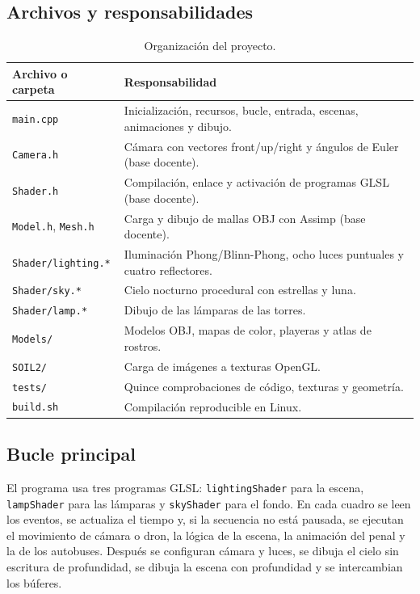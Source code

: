 \documentclass[12pt,letterpaper]{article}
\begin{document}
\subsection{Archivos y responsabilidades}
\begin{table}[H]
\centering
\small
\begin{tabular}{p{}p{}}
\toprule
\textbf{Archivo o carpeta} & \textbf{Responsabilidad}\\
\midrule
\texttt{main.cpp} & Inicialización, recursos, bucle, entrada, escenas, animaciones y dibujo.\\
\texttt{Camera.h} & Cámara con vectores front/up/right y ángulos de Euler (base docente).\\
\texttt{Shader.h} & Compilación, enlace y activación de programas GLSL (base docente).\\
\texttt{Model.h}, \texttt{Mesh.h} & Carga y dibujo de mallas OBJ con Assimp (base docente).\\
\texttt{Shader/lighting.*} & Iluminación Phong/Blinn-Phong, ocho luces puntuales y cuatro reflectores.\\
\texttt{Shader/sky.*} & Cielo nocturno procedural con estrellas y luna.\\
\texttt{Shader/lamp.*} & Dibujo de las lámparas de las torres.\\
\texttt{Models/} & Modelos OBJ, mapas de color, playeras y atlas de rostros.\\
\texttt{SOIL2/} & Carga de imágenes a texturas OpenGL.\\
\texttt{tests/} & Quince comprobaciones de código, texturas y geometría.\\
\texttt{build.sh} & Compilación reproducible en Linux.\\
\bottomrule
\end{tabular}
\caption{Organización del proyecto.}\label{tab:archivos}
\end{table}

\subsection{Bucle principal}
El programa usa tres programas GLSL: \texttt{lightingShader} para la escena,
\texttt{lampShader} para las lámparas y \texttt{skyShader} para el fondo. En cada cuadro se leen los
eventos, se actualiza el tiempo y, si la secuencia no está pausada, se ejecutan el movimiento de
cámara o dron, la lógica de la escena, la animación del penal y la de los autobuses. Después se
configuran cámara y luces, se dibuja el cielo sin escritura de profundidad, se dibuja la escena con
profundidad y se intercambian los búferes.
\end{document}

